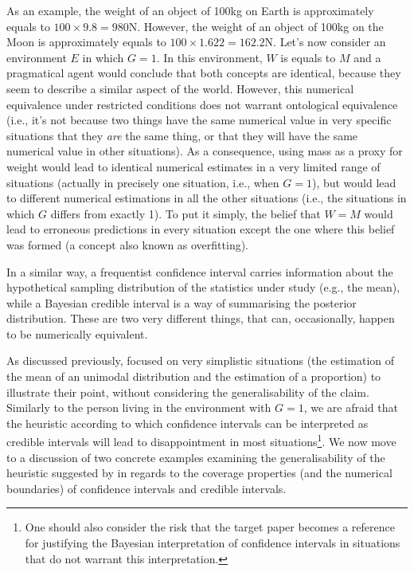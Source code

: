 \documentclass[a4paper,man,natbib,floatsintext,donotrepeattitle]{apa6}
\begin{document}
As an example, the weight of an object of 100kg on Earth is approximately equals to $100 \times 9.8 = 980 \text{N}$. However, the weight of an object of 100kg on the Moon is approximately equals to $100 \times 1.622 = 162.2\text{N}$. Let's now consider an environment $E$ in which $G = 1$. In this environment, $W$ is equals to $M$ and a pragmatical agent would conclude that both concepts are identical, because they seem to describe a similar aspect of the world. However, this numerical equivalence under restricted conditions does not warrant ontological equivalence (i.e., it's not because two things have the same numerical value in very specific situations that they \textit{are} the same thing, or that they will have the same numerical value in other situations). As a consequence, using mass as a proxy for weight would lead to identical numerical estimates in a very limited range of situations (actually in precisely one situation, i.e., when $G = 1$), but would lead to different numerical estimations in all the other situations (i.e., the situations in which $G$ differs from exactly 1). To put it simply, the belief that $W = M$ would lead to erroneous predictions in every situation except the one where this belief was formed (a concept also known as overfitting).

In a similar way, a frequentist confidence interval carries information about the hypothetical sampling distribution of the statistics under study (e.g., the mean), while a Bayesian credible interval is a way of summarising the posterior distribution. These are two very different things, that can, occasionally, happen to be numerically equivalent.

As discussed previously, \cite{albers_credible_2018} focused on very simplistic situations (the estimation of the mean of an unimodal distribution and the estimation of a proportion) to illustrate their point, without considering the generalisability of the claim. Similarly to the person living in the environment with $G = 1$, we are afraid that the heuristic according to which confidence intervals can be interpreted as credible intervals will lead to disappointment in most situations\footnote{One should also consider the risk that the target paper becomes a reference for justifying the Bayesian interpretation of confidence intervals in situations that do not warrant this interpretation.}. We now move to a discussion of two concrete examples examining the generalisability of the heuristic suggested by \cite{albers_credible_2018} in regards to the coverage properties (and the numerical boundaries) of confidence intervals and credible intervals.
\end{document}
